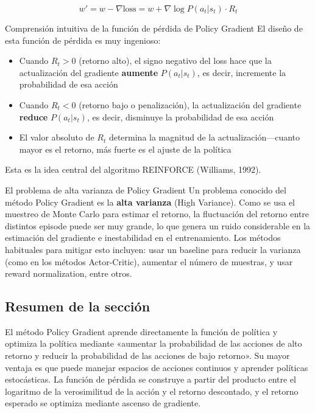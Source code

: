 \documentclass[a4paper]{article}
\begin{document}
$$w' = w - \nabla \text{loss} = w + \nabla \log P(a_t | s_t) \cdot R_t$$

\begin{importantbox}{Comprensión intuitiva de la función de pérdida de Policy Gradient}
El diseño de esta función de pérdida es muy ingenioso:
\begin{itemize}
    \item Cuando $R_t > 0$ (retorno alto), el signo negativo del loss hace que la actualización del gradiente \textbf{aumente} $P(a_t|s_t)$, es decir, incremente la probabilidad de esa acción
    \item Cuando $R_t < 0$ (retorno bajo o penalización), la actualización del gradiente \textbf{reduce} $P(a_t|s_t)$, es decir, disminuye la probabilidad de esa acción
    \item El valor absoluto de $R_t$ determina la magnitud de la actualización—cuanto mayor es el retorno, más fuerte es el ajuste de la política
\end{itemize}
Esta es la idea central del algoritmo REINFORCE (Williams, 1992).
\end{importantbox}

\begin{warningbox}{El problema de alta varianza de Policy Gradient}
Un problema conocido del método Policy Gradient es la \textbf{alta varianza} (High Variance). Como se usa el muestreo de Monte Carlo para estimar el retorno, la fluctuación del retorno entre distintos episode puede ser muy grande, lo que genera un ruido considerable en la estimación del gradiente e inestabilidad en el entrenamiento. Los métodos habituales para mitigar esto incluyen: usar un baseline para reducir la varianza (como en los métodos Actor-Critic), aumentar el número de muestras, y usar reward normalization, entre otros.
\end{warningbox}

\subsection{Resumen de la sección}

El método Policy Gradient aprende directamente la función de política y optimiza la política mediante «aumentar la probabilidad de las acciones de alto retorno y reducir la probabilidad de las acciones de bajo retorno». Su mayor ventaja es que puede manejar espacios de acciones continuos y aprender políticas estocásticas. La función de pérdida se construye a partir del producto entre el logaritmo de la verosimilitud de la acción y el retorno descontado, y el retorno esperado se optimiza mediante ascenso de gradiente.
\end{document}
